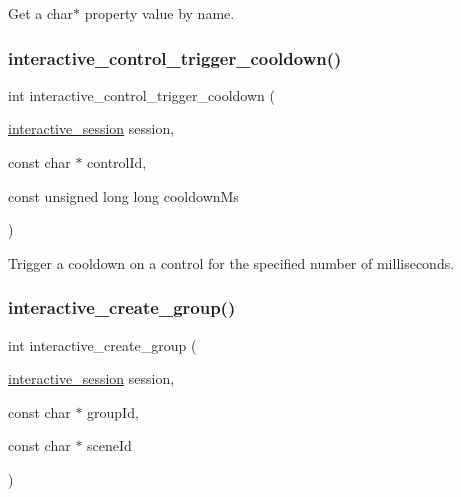 Get a {\ttfamily char$\ast$} property value by name. 

\mbox{\label{group___interactivity_gae648fbf545602c1822dae3467da34b71}} 
\subsubsection{\texorpdfstring{interactive\+\_\+control\+\_\+trigger\+\_\+cooldown()}{interactive\_control\_trigger\_cooldown()}}
{\footnotesize\ttfamily int interactive\+\_\+control\+\_\+trigger\+\_\+cooldown (\begin{DoxyParamCaption}\item[{\mbox{\hyperlink{group___interactivity_ga6d8819d38b8dc8994a2299cf22a65a31}{interactive\+\_\+session}}}]{session,  }\item[{const char $\ast$}]{control\+Id,  }\item[{const unsigned long long}]{cooldown\+Ms }\end{DoxyParamCaption})}



Trigger a cooldown on a control for the specified number of milliseconds. 

\mbox{\label{group___interactivity_ga733784dd287b3fefa0882234f76f0d82}} 
\subsubsection{\texorpdfstring{interactive\+\_\+create\+\_\+group()}{interactive\_create\_group()}}
{\footnotesize\ttfamily int interactive\+\_\+create\+\_\+group (\begin{DoxyParamCaption}\item[{\mbox{\hyperlink{group___interactivity_ga6d8819d38b8dc8994a2299cf22a65a31}{interactive\+\_\+session}}}]{session,  }\item[{const char $\ast$}]{group\+Id,  }\item[{const char $\ast$}]{scene\+Id }\end{DoxyParamCaption})}



